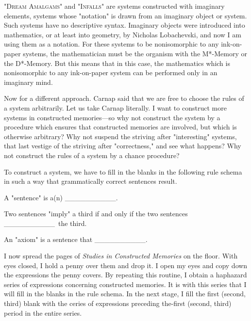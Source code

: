 \documentclass[10pt,twoside]{memoir}
\newcommand{\essaytitle}[1]{
	\emph{#1}}
\begin{document}
\begin{enumerate}
{\begin{enumerate}
\begin{sysrules}
\begin{sysrules}
\begin{sysrules}
\begin{sysrules}
"\textsc{Dream Amalgams}" and "\textsc{Infalls}" are systems constructed with 
imaginary elements, systems whose "notation" is drawn from an imaginary 
object or system. Such systems have no descriptive syntax. Imaginary objects 
were introduced into mathematics, or at least into geometry, by Nicholas 
Lobachevski, and now I am using them as a notation. For these systems to 
be nonisomorphic to any ink-on-paper systems, the mathematician must be 
the organism with the M*-Memory or the D*-Memory. But this means that 
in this case, the mathematics which is nonisomorphic to any ink-on-paper 
system can be performed only in an imaginary mind. 

Now for a different approach. Carnap said that we are free to choose 
the rules of a system arbitrarily. Let us take Carnap literally. I want to 
construct more systems in constructed memories---so why not construct the 
system by a procedure which ensures that constructed memories are 
involved, but which is otherwise arbitrary? Why not suspend the striving 
after "interesting" systems, that last vestige of the striving after 
"correctness," and see what happens? Why not construct the rules of a 
system by a chance procedure? 

To construct a system, we have to fill in the blanks in the following rule 
schema in such a way that grammatically correct sentences result. 

\newcommand{\blankspace}{\_\_\_\_\_\_\_\_\_\_}


\begin{sysrules}
A "sentence" is a(n) \blankspace.

Two sentences "imply" a third if and only if the two sentences \blankspace\ the third. 

An "axiom" is a sentence that \blankspace.
\end{sysrules}


I now spread the pages of \essaytitle{Studies in Constructed Memories} on the floor. 
With eyes closed, I hold a penny over them and drop it. I open my eyes and 
copy down the expressions the penny covers. By repeating this routine, I 
obtain a haphazard series of expressions concerning constructed memories. It 
is with this series that I will fill in the blanks in the rule schema. In the next 
stage, I fill the first (second, third) blank with the ceries of expressions 
preceding the-first (second, third) period in the entire series. 



\end{sysrules}
\end{sysrules}
\end{sysrules}
\end{sysrules}
\end{enumerate}}
\end{enumerate}
\end{document}
